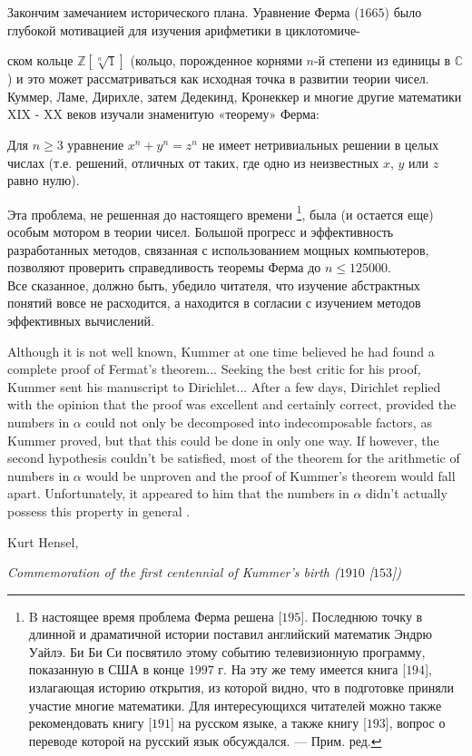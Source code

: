 Закончим замечанием исторического плана. Уравнение Ферма ($1665$)
было глубокой мотивацией для изучения арифметики в циклотомиче-

\noindent ском кольце $\mathbb{Z}[\sqrt[n]1]$ (кольцо, порожденное корнями $n$-й степени из единицы в $\mathbb{C}$) и это может рассматриваться как исходная точка в развитии теории чисел. Куммер, Ламе, Дирихле, затем Дедекинд, Кронеккер и многие другие математики XIX - XX веков изучали знаменитую «теорему» Ферма:
\\

\begin{thm}
Для $n \ge 3$ уравнение $x^n + y^n = z^n$ не имеет нетривиальных 
решении в целых числах (т.е. решений, отличных от таких, где одно из
неизвестных $x$, $y$ или $z$ равно нулю).
\end{thm}

Эта проблема, не решенная до настоящего времени \footnote{B настоящее время проблема Ферма решена [$195$]. Последнюю точку в длинной
и драматичной истории поставил английский математик Эндрю Уайлэ. Би Би Си
посвятило этому событию телевизионную программу, показанную в США в конце
$1997$ г. На эту же тему имеется книга [$194$], излагающая историю открытия, из которой видно, что в подготовке приняли участие многие математики. Для 
интересующихся читателей можно также рекомендовать книгу [$191$] на русском языке, а также книгу [$193$], вопрос о переводе которой на русский язык обсуждался. — Прим. ред.}, была (и 
остается еще) особым мотором в теории чисел. Большой прогресс и 
эффективность разработанных методов, связанная с использованием мощных
компьютеров, позволяют проверить справедливость теоремы Ферма до
$n \le 125000$.
\\

Все сказанное, должно быть, убедило читателя, что изучение
абстрактных понятий вовсе не расходится, а находится в согласии с
изучением методов эффективных вычислений.
\\

\newpage


\epigraph{Although it is not well known, Kummer at one time believed he had found a complete proof of Fermat's theorem... Seeking the
best critic for his proof, Kummer sent his manu\-script to Dirichlet...
After a few days, Dirichlet replied with the opinion that the proof
was excellent and certainly correct, provided the numbers in $\alpha$ could
not only be decomposed into indecom\-posable factors, as Kummer
proved, but that this could be done in only one way. If however,
the second hypothesis couldn't be satisfied, most of the theorem for
the arithmetic of numbers in $\alpha$ would be unproven and the proof
of Kummer's theorem would fall apart. Unfortunately, it appeared to him that the numbers in $\alpha$ didn't actually possess this property in
general \footnotemark[1].}{Kurt Hensel,

\emph{Commemoration of the first centennial of Kummer's birth ($1910$ [$153$])}}

